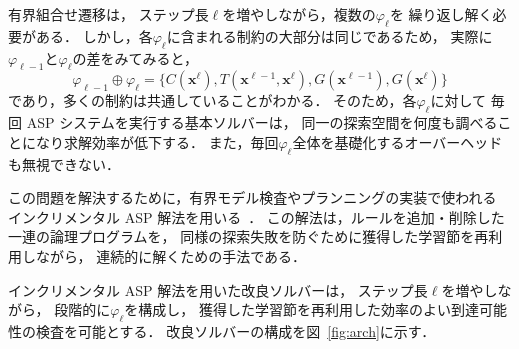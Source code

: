 

有界組合せ遷移は，
ステップ長$\ell$を増やしながら，複数の$\varphi_\ell$を
繰り返し解く必要がある．
しかし，各$\varphi_\ell$に含まれる制約の大部分は同じであるため，
実際に$\varphi_{\ell -1}$と$\varphi_{\ell}$の差をみてみると，
\[
  \varphi_{\ell -1} \oplus \varphi_{\ell} = 
    \{C(\bm{x}^{\ell}), T(\bm{x}^{\ell -1}, 
    \bm{x}^{\ell}), G(\bm{x}^{\ell -1}), G(\bm{x}^{\ell})\}
\]
であり，多くの制約は共通していることがわかる．
そのため，各$\varphi_\ell$に対して
毎回 ASP システムを実行する基本ソルバーは，
同一の探索空間を何度も調べることになり求解効率が低下する．
また，毎回$\varphi_\ell$全体を基礎化するオーバーヘッドも無視できない．

この問題を解決するために，有界モデル検査やプランニングの実装で使われる
インクリメンタル ASP 解法を用いる~\cite{GebserKKS19}．
この解法は，ルールを追加・削除した一連の論理プログラムを，
同様の探索失敗を防ぐために獲得した学習節を再利用しながら，
連続的に解くための手法である．

インクリメンタル ASP 解法を用いた改良ソルバーは，
ステップ長$\ell$を増やしながら，
段階的に$\varphi_\ell$を構成し，
獲得した学習節を再利用した効率のよい到達可能性の検査を可能とする．
改良ソルバーの構成を図~\ref{fig:arch}に示す．

% 

